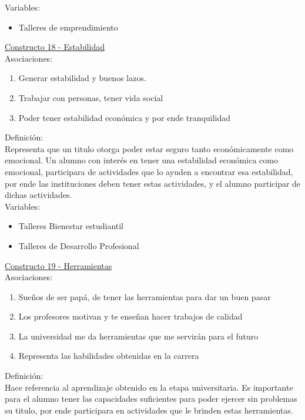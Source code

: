 Variables:
\begin{itemize}
	\item Talleres de emprendimiento	
\end{itemize} 

\underline {Constructo 18 - Estabilidad} \\
Asociaciones:
\begin{enumerate}
	\item Generar estabilidad y buenos lazos.
	\item Trabajar con personas, tener vida social 	
	\item Poder tener estabilidad económica y por ende tranquilidad
\end{enumerate}

Definición:\\
Representa que un titulo otorga poder estar seguro tanto económicamente como emocional. Un alumno con interés en tener una estabilidad económica como emocional, participara de actividades que lo ayuden a encontrar esa estabilidad, por ende las instituciones deben tener estas actividades, y el alumno participar de dichas actividades.\\

Variables:
\begin{itemize}
	\item Talleres Bienestar estudiantil
	\item Talleres de Desarrollo Profesional	
\end{itemize} 


\underline {Constructo 19 - Herramientas} \\
Asociaciones:
\begin{enumerate}
	\item Sueños de ser papá, de tener las herramientas para dar un buen pasar
	\item Los profesores motivan y te enseñan hacer trabajos de calidad	
	\item La universidad me da herramientas que me servirán para el futuro
	\item Representa las habilidades obtenidas en la carrera
\end{enumerate}

Definición:\\
Hace referencia al aprendizaje obtenido en la etapa universitaria. Es importante para el alumno tener las capacidades suficientes para poder ejercer sin problemas su titulo, por ende participara en actividades que le brinden estas herramientas.\\

